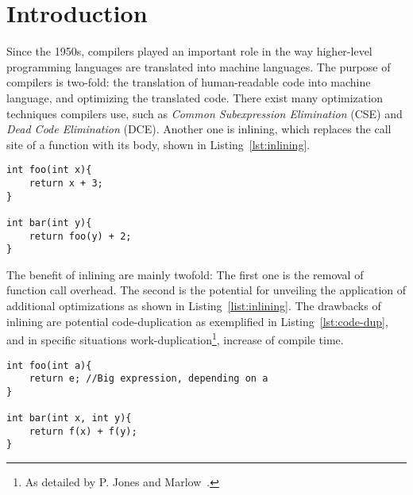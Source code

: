 
\section{Introduction}
\label{introduction}

Since the 1950s, compilers played an important role in the way higher-level
programming languages are translated into machine languages. The purpose of
compilers is two-fold: the translation of human-readable code into machine
language, and optimizing the translated code. There exist many optimization
techniques compilers use, such as \textit{Common Subexpression Elimination}
(CSE) and \textit{Dead Code Elimination} (DCE). Another one is inlining, which
replaces the call site of a function with its body, shown in
Listing~\ref{lst:inlining}.

\begin{lstlisting}[label={lst:inlining}, style=customcpp,
caption={Function \lstinline!foo()! inlined into function \lstinline!bar()!
results in the body of \lstinline!bar()! being \lstinline!return x + 3 + 2!, in
which case constant folding can be applied, replacing the \textit{return}
expression of \lstinline!bar()! with: \lstinline!x + 5!.}]
int foo(int x){
	return x + 3;
}

int bar(int y){
	return foo(y) + 2;
}
\end{lstlisting}
\vspace{-4\parskip} %

The benefit of inlining are mainly twofold: The first one is the removal of
function call overhead. The second is the potential for unveiling the
application of additional optimizations as shown in Listing~\ref{list:inlining}.
The drawbacks of inlining are potential code-duplication as exemplified in
Listing~\ref{lst:code-dup}, and in specific situations
work-duplication\footnote{As detailed by P. Jones and Marlow~\cite{GHCPaper}.},
increase of compile time.

\begin{lstlisting}[label={lst:code-dup}, style=customcpp,
caption={Code duplication in \lstinline!bar()!, when inlining \lstinline!foo()!
into \lstinline!bar()!. The big expression \lstinline!e! in \lstinline!foo()!,
would be duplicated when inlined into \lstinline!bar()!, potentially leading to
code-duplication. However, CSE might be able to mitigate code-duplication.}]
int foo(int a){
	return e; //Big expression, depending on a
}

int bar(int x, int y){
	return f(x) + f(y);
}
\end{lstlisting}
\vspace{-4\parskip} %

